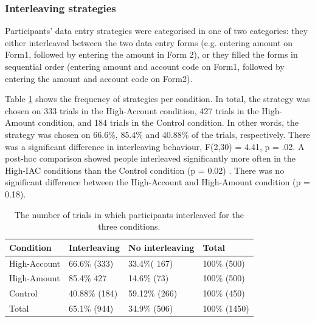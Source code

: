 \subsubsection{Interleaving strategies}

Participants' data entry strategies were categorised in one of two categories: they either interleaved between the two data entry forms (e.g. entering amount on Form1, followed by entering the amount in Form 2), or they filled the forms in sequential order (entering amount and account code on Form1, followed by entering the amount and account code on Form2).

Table \ref{table:ch34_Study5interleavingfreqtbl} shows the frequency of strategies per condition. In total, the strategy was chosen on 333 trials in the High-Account condition, 427 trials in the High-Amount condition, and 184 trials in the Control condition. In other words, the strategy was chosen on 66.6\%, 85.4\% and 40.88\% of the trials, respectively.  There was a significant difference in interleaving behaviour,
F(2,30) = 4.41, p = .02. A post-hoc comparison showed people interleaved significantly more often in the High-IAC conditions than the Control condition  (p = 0.02) . There was no significant difference between the High-Account and High-Amount condition (p = 0.18).



\begin{table}[]
\centering
\begin{tabular}{|l|l|l|l|}
\hline
Condition    & Interleaving & No interleaving & Total \\ \hline
High-Account & 66.6\% (333)          & 33.4\%( 167)             & 100\% (500)   \\ \hline
High-Amount  & 85.4\% 427          & 14.6\% (73)              & 100\% (500)   \\ \hline
Control      & 40.88\% (184)          & 59.12\% (266)             & 100\% (450)   \\ \hline
Total             & 65.1\% (944)          & 34.9\% (506)             & 100\% (1450)  \\ \hline
\end{tabular}
\caption{The number of trials in which participants interleaved for the three conditions.}\label{table:ch34_Study5interleavingfreqtbl}
\end{table}

